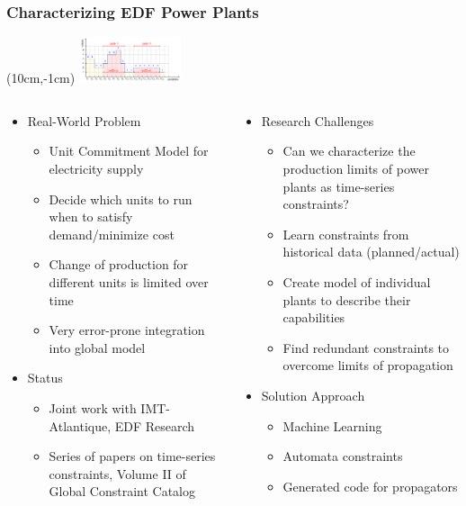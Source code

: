 \begin{frame}
\frametitle{Characterizing EDF Power Plants}
\begin{textblock*}{3cm}(10cm,-1cm)
\includegraphics[width=3cm]{images/minwidthpeak}
\end{textblock*}

\begin{columns}[b]
\begin{column}{0.5\textwidth}
\begin{itemize}
\item Real-World Problem
\begin{itemize}
\item Unit Commitment Model for electricity supply
\item Decide which units to run when to satisfy demand/minimize cost
\item Change of production for different units is limited over time
\item Very error-prone integration into global model
\end{itemize}
\item Status
\begin{itemize}
\item Joint work with IMT-Atlantique, EDF Research
\item Series of papers on time-series constraints, Volume II of Global Constraint Catalog
\end{itemize}
\end{itemize}
\end{column}
\begin{column}{0.5\textwidth}
\begin{itemize}
\item Research Challenges
\begin{itemize}
\item Can we characterize the production limits of power plants as time-series constraints?
\item Learn constraints from historical data (planned/actual)
\item Create model of individual plants to describe their capabilities
\item Find redundant constraints to overcome limits of propagation  
\end{itemize}
\item Solution Approach
\begin{itemize}
\item Machine Learning
\item Automata constraints
\item Generated code for propagators
\end{itemize}
\end{itemize}
\end{column}
\end{columns}
\end{frame}

